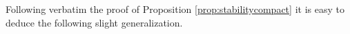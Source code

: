 \documentclass[11pt,twoside,a4paper]{article}
\newcommand{\setN}{\mathbb{N}}
\newcommand{\de}{\ensuremath{\, \mathrm d}} %
\newcommand{\weakto}{\rightharpoonup}
\newcommand{\thmsymbol}{\( \square \)}
\newcommand{\CD}{\mathsf{CD}}
\newcommand{\di}{\mathsf d} %
\newcommand{\m}{\mathfrak m} %
\DeclareMathOperator{\OptPlans}{OptPlans}
\newcommand{\ProbTwo}{\mathscr{P}_2}
\theoremstyle{theorem}
\newtheorem{prop}[theorem]{Proposition}
\theoremstyle{definition}
\theoremstyle{remark}
\theoremstyle{proof}
\newtheorem*{pro}{Proof}
\newenvironment{pr}{\begin{pro}%
 \renewcommand{\qedsymbol}{\thmsymbol}\pushQED{\qed}}%
 {\popQED\end{pro}}
\begin{document}


Following verbatim the proof of Proposition \ref{prop:stabilitycompact} it is easy to deduce the following slight generalization. 
\end{document}

